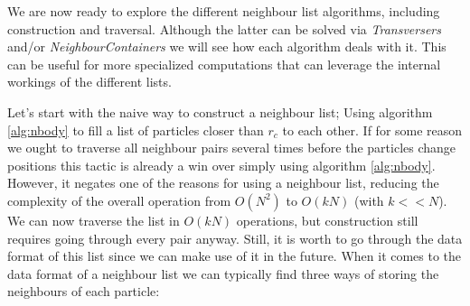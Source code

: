 \documentclass[twoside,openright,titlepage,numbers=noenddot,%
headinclude,footinclude,cleardoublepage=empty,abstract=on,
BCOR=5mm,fontsize=11pt, dvipsnames, paper=b5
]{scrreprt}
\begin{document}
We are now ready to explore the different neighbour list algorithms, including construction and traversal. Although the latter can be solved via \emph{Transversers} and/or \emph{NeighbourContainers} we will see how each algorithm deals with it. This can be useful for more specialized computations that can leverage the internal workings of the different lists.

Let's start with the naive way to construct a neighbour list; Using algorithm \ref{alg:nbody} to fill a list of particles closer than $r_{c}$ to each other. 
If for some reason we ought to traverse all neighbour pairs several times before the particles change positions this tactic is already a win over simply using algorithm \ref{alg:nbody}. However, it negates one of the reasons for using a neighbour list, reducing the complexity of the overall operation from $O(N^2)$ to $O(kN)$ (with $k<<N$). We can now traverse the list in $O(kN)$ operations, but construction still requires going through every pair anyway.
Still, it is worth to go through the data format of this list since we can make use of it in the future. When it comes to the data format of a neighbour list we can typically find three ways of storing the neighbours of each particle:
\end{document}
